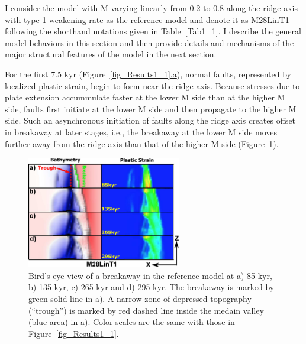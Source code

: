 I consider the model with M varying linearly from 0.2 to 0.8 along the ridge axis with type 1 weakening rate as the reference model and denote it as M28LinT1 following the shorthand notations given in Table~\hyperref[Tab1_1]{\ref{Tab1_1}}. I describe the general model behaviors in this section and then provide details and mechanisms of the major structural features of the model in the next section.

For the first 7.5 kyr (Figure~\hyperref[fig_Results1_1]{\ref{fig_Results1_1}.a}), %
normal faults, represented by localized plastic strain, begin to form near the ridge axis.
Because stresses due to plate extension accummulate faster at the lower M side than at the higher M side, faults first initiate at the lower M side and then propagate to the higher M side. Such an asynchronous initiation of faults along the ridge axis creates offset in breakaway at later stages, i.e., the breakaway at the lower M side moves further away from the ridge axis than that of the higher M side (Figure~\hyperref[fig_Results1_4]{\ref{fig_Results1_4}}).

\begin{figure}[h]
   \centering
     \includegraphics[width=0.6\textwidth]{./Figures/fig_Results1_4.eps}
   \caption{Bird's eye view of a breakaway in the reference model at a) 85 kyr, b) 135 kyr, c) 265 kyr and d) 295 kyr. The breakaway is marked by green solid line in a). A narrow zone of depressed topography (``trough'') is marked by red dashed line inside the medain valley (blue area) in a). Color scales are the same with those in Figure~\hyperref[fig_Results1_1]{\ref{fig_Results1_1}}.}
  \label{fig_Results1_4}
\end{figure}

